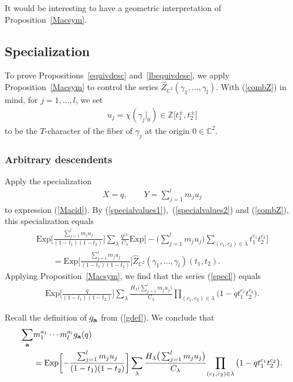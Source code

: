 \documentclass[pdftex]{sigma}
\numberwithin{equation}{section}
\newcommand{\Exp}{\mathrm{Exp}}
\def\C{\mathbb C}
\def\Z{\mathbb Z}
\begin{document}
It would be interesting to have a geometric interpretation of Proposition~\ref{Macsym}.

\subsection{Specialization}
To prove Propositions~\ref{equivdesc} and~\ref{lbequivdesc}, we apply Proposition~\ref{Macsym} to control the series $\hat{Z}_{\C^2}(\gamma_1,\dots,\gamma_l)$. With (\ref{combZ}) in mind, for $j=1,\dots,l$, we set
\begin{gather*}
u_j=\chi(\gamma_j|_0)\in \Z\big[t_1^{\pm},t_2^{\pm}\big]
\end{gather*}
to be the $T$-character of the fiber of $\gamma_j$ at the origin $0\in\C^2$.

\subsubsection{Arbitrary descendents}\label{ardescpf}
Apply the specialization
\begin{gather*}
X=q, \qquad Y=\sum_{j=1}^{l} m_ju_j
\end{gather*}
to expression (\ref{Macid}).
By (\ref{specialvalues1}),~(\ref{specialvalues2}) and (\ref{combZ}), this specialization equals
\begin{gather}
\Exp\bigg[\frac{\sum_{j=1}^{l} m_ju_j}{(1-t_1)(1-t_2)}\bigg] \sum_{\lambda} \frac{q^{|\lambda|}}{C_{\lambda}}\Exp\Biggl[{-}\bigg(\sum_{j=1}^{l} m_ju_j\bigg) \sum_{(c_1,c_2)\in \lambda}t_1^{c_1}t_2^{c_2} \Biggr]\nonumber
\\ \qquad
{}=\Exp\bigg[\frac{\sum_{j=1}^{l} m_ju_j}{(1-t_1)(1-t_2)}\bigg] \hat{Z}_{\C^2}(\gamma_1,\dots,\gamma_l)(t_1,t_2).\label{specl}
\end{gather}
Applying Proposition~\ref{Macsym}, we find that the series (\ref{specl}) equals
\begin{align*}
\Exp\bigg[\frac{q}{(1-t_1)(1-t_2)}\bigg] \sum_{\lambda} \frac{H_{\lambda} \big(\sum_{j=1}^{l} m_ju_j\big)}{C_{\lambda}} { \prod_{(c_1,c_2)\in \lambda} \big(1-qt_1^{c_1}t_2^{c_2}\big)}.
\end{align*}

Recall the definition of $g_{\bf{a}}$ from (\ref{gdef}). We conclude that
\begin{align}\label{rpart} \nonumber
\sum_{\bf{a}} &m_1^{a_1}\cdots m_l^{a_l} g_{\bf{a}}(q)\\&= \Exp\bigg[{-}\frac{\sum_{j=1}^{l} m_ju_j}{(1-t_1)(1-t_2)}\bigg] \sum_{\lambda} \frac{H_{\lambda} \big(\sum_{j=1}^{l} m_ju_j\big)}{C_{\lambda}} { \prod_{(c_1,c_2)\in \lambda} \big(1-qt_1^{c_1}t_2^{c_2}\big)}.
\end{align}
\end{document}
